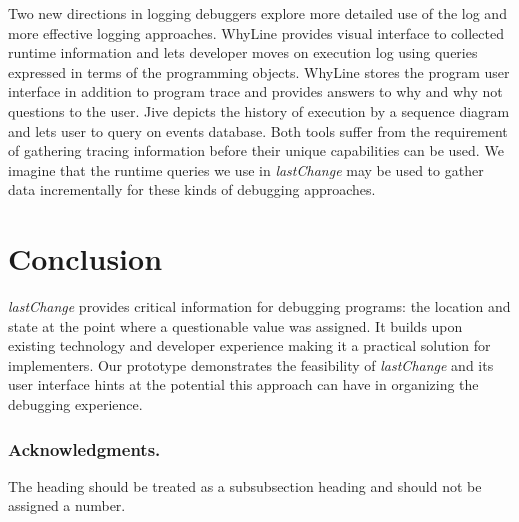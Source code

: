 \documentclass[runningheads,a4paper]{llncs}
\begin{document}
Two new directions in logging debuggers explore more detailed use of
the log and more effective logging approaches. WhyLine\cite{Ko}
provides visual interface to collected runtime information and lets
developer moves on execution log using queries expressed in terms of
the programming objects. WhyLine stores the program user interface in
addition to program trace and provides answers to why and why not
questions to the user. Jive\cite{Czyz} depicts the history of
execution by a sequence diagram and lets user to query on events
database. Both tools suffer from the requirement of gathering tracing information before their unique capabilities can be used.
We imagine that the runtime queries we use in \textit{lastChange}  may be used to gather data incrementally for these kinds of debugging approaches.



 


\section{Conclusion}
\textit{lastChange} provides critical information for debugging programs: the location and state at the point where a questionable value was assigned. It builds upon existing technology and developer experience making it a practical solution for implementers. Our prototype demonstrates the feasibility of \textit{lastChange} and its user interface hints at the potential this approach can have in organizing the debugging experience. 











\subsubsection*{Acknowledgments.} The heading should be treated as a
subsubsection heading and should not be assigned a number.
\end{document}
